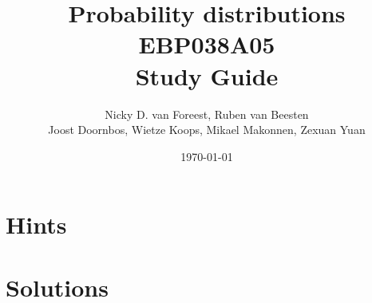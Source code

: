 \documentclass[a4paper,12pt]{book}
\author{Nicky D. van Foreest, Ruben van Beesten \\
  Joost Doornbos, Wietze Koops, Mikael Makonnen, Zexuan Yuan
}
\date{\today}
\title{Probability distributions EBP038A05\\
Study Guide}
\begin{document}
\maketitle
\tableofcontents



\setcounter{chapter}{6}








\clearpage
\chapter{Hints}

\clearpage
\chapter{Solutions}


\end{document}
